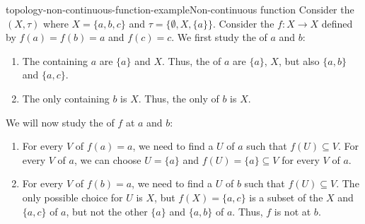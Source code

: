 \documentclass[preview]{standalone}
\begin{document}
\begin{snippetexample}{topology-non-continuous-function-example}{Non-continuous function}
    Consider the \topologicalspace \((X, \tau)\)
    where \(X = \{a, b, c\}\) and \(\tau = \{\emptyset, X, \{a\}\}\).
    Consider the \function \(f\colon X \to X\) defined by
    \(f(a) = f(b) = a\) and \(f(c) = c\).
    We first study the \neighborhood[neighborhoods] of \(a\) and \(b\):
    \begin{enumerate}
        \item The  containing \(a\)
        are \(\{a\}\) and \(X\). Thus, the \neighborhood[neighborhoods] of \(a\) are
        \(\{a\}\), \(X\), but also \(\{a, b\}\) and \(\{a, c\}\).
        \item The only  containing \(b\)
        is \(X\). Thus, the only \neighborhood of \(b\) is
        \(X\).
    \end{enumerate}
    We will now study the \topologycontinuous[continuity] of \(f\) at \(a\) and \(b\):
    \begin{enumerate}
        \item For every \neighborhood \(V\) of \(f(a) = a\),
        we need to find a \neighborhood \(U\) of \(a\) such that
        \(f(U) \subseteq V\). For every \neighborhood \(V\) of \(a\),
        we can choose \(U = \{a\}\) and \(f(U) = \{a\} \subseteq V\)
        for every \neighborhood \(V\) of \(a\).
        \item For every \neighborhood \(V\) of \(f(b) = a\),
        we need to find a \neighborhood \(U\) of \(b\) such that
        \(f(U) \subseteq V\). The only possible choice for \(U\) is \(X\),
        but \(f(X) = \{a, c\}\) is a subset of the \neighborhood[neighborhoods] \(X\)
        and \(\{a, c\}\) of \(a\), but not the other \neighborhood[neighborhoods] \(\{a\}\) and \(\{a, b\}\)
        of \(a\). Thus, \(f\) is not \topologycontinuous at \(b\).
    \end{enumerate}
\end{snippetexample}
\end{document}
